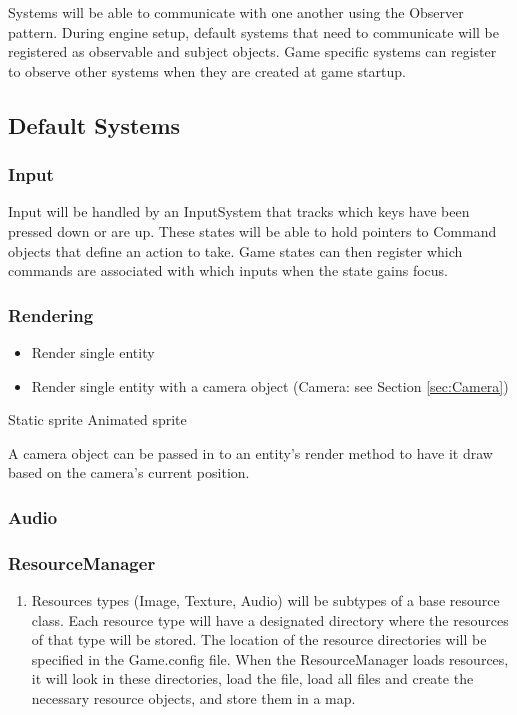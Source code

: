 \documentclass[12pt]{article}
\begin{document}
Systems will be able to communicate with one another using the Observer pattern.  During engine setup, default systems that need to communicate will be registered as observable and subject objects.  Game specific systems can register to observe other systems when they are created at game startup.

\subsection{Default Systems}
\subsubsection{	Input }
Input will be handled by an InputSystem that tracks which keys have been pressed down or are up.  These states will be able to hold pointers to Command objects that define an action to take.  Game states can then register which commands are associated with which inputs when the state gains focus.
 

\subsubsection{	Rendering }

	\begin{itemize}
		\item Render single entity
		\item Render single entity with a camera object (Camera: see Section \ref{sec:Camera})
	\end{itemize}
	
Static sprite 
Animated sprite 

A camera object can be passed in to an entity's render method to have it draw based on the camera's current position.

\subsubsection{	Audio}

\subsubsection{ResourceManager}
\begin{enumerate}
	\item Resources types (Image, Texture, Audio) will be subtypes of a base resource class.  Each resource type will have a designated directory where the resources of that type will be stored.  The location of the resource directories will be specified in the Game.config file.  When the ResourceManager loads resources, it will look in these directories, load the file, load all files and create the necessary resource objects, and store them in a map.  
\end{enumerate}
\end{document}

